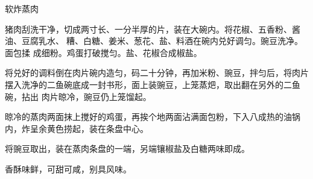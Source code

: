 \begin{recipe}{软炸蒸肉}

\ingredients


\preparation

\step 猪肉刮洗干净，切成两寸长、一分半厚的片，装在大碗内。将花椒、五香粉、酱
油、豆腐乳水、𰪿糟、白糖、姜米、葱花、盐、料酒在碗内兑好调匀。豌豆洗净。面包揉
成细粉。鸡蛋打破搅匀。盐、花椒合成椒盐。

\step 将兑好的调料倒在肉片碗内造匀，码二十分钟，再加米粉、豌豆，拌匀后，将肉片
摆入洗净的二鱼碗底成一封书形，面上装豌豆，上笼蒸𤆵，取出翻在另外的二鱼碗，拈出
肉片晾冷，豌豆仍上笼馏起。

\step 晾冷的蒸肉两面抹上搅好的鸡蛋，再挨个地两面沾满面包粉，下入八成热的油锅
内，炸呈余黄色捞起，装在条盘中心。

\step 将豌豆取出，装在蒸肉条盘的一端，另端镶椒盐及白糖两味即成。

\features

香酥味鲜，可甜可咸，别具风味。

\end{recipe}

